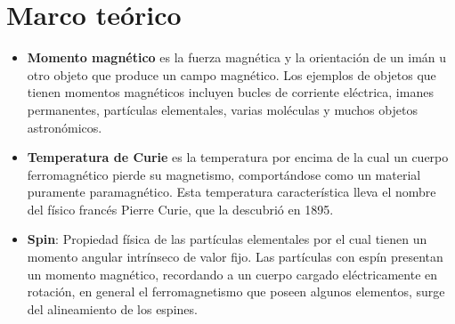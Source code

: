 \section{Marco teórico}
\begin{itemize}
    \item \textbf{Momento magnético} es la fuerza magnética y la orientación de un imán u otro objeto que produce un campo magnético. Los ejemplos de objetos que tienen momentos magnéticos incluyen bucles de corriente eléctrica, imanes permanentes, partículas elementales, varias moléculas y muchos objetos astronómicos.
    \item \textbf{Temperatura de Curie} es la temperatura por encima de la cual un cuerpo ferromagnético pierde su magnetismo, comportándose como un material puramente paramagnético. Esta temperatura característica lleva el nombre del físico francés Pierre Curie, que la descubrió en 1895.
    \item \textbf{Spin}: Propiedad física de las partículas elementales por el cual tienen un momento angular intrínseco de valor fijo. Las partículas con espín presentan un momento magnético, recordando a un cuerpo cargado eléctricamente en rotación, en general el ferromagnetismo que poseen algunos elementos, surge del alineamiento de los espines.
\end{itemize}
